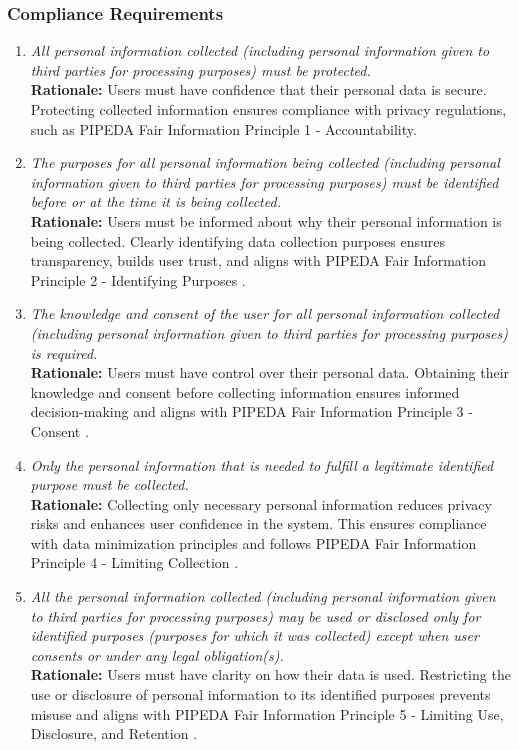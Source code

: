 \documentclass[]{article}
\begin{document}
\subsubsection{Compliance Requirements}
\label{ssub:compliance_requirements}
\begin{enumerate}[{LR-COMP}1. ]
	\item \textit{All personal information collected (including personal information given to third parties for processing purposes) must be protected.}
	\\ \textbf{Rationale:} Users must have confidence that their personal data is secure. Protecting collected information ensures compliance with privacy regulations, such as PIPEDA Fair Information Principle 1 - Accountability\cite{PIPEDA1}.
	\item \textit{The purposes for all personal information being collected (including personal information given to third parties for processing purposes) must be identified before or at the time it is being collected.}
    \\ \textbf{Rationale:} Users must be informed about why their personal information is being collected. Clearly identifying data collection purposes ensures transparency, builds user trust, and aligns with PIPEDA Fair Information Principle 2 - Identifying Purposes \cite{PIPEDA2}.  

    \item \textit{The knowledge and consent of the user for all personal information collected (including personal information given to third parties for processing purposes) is required.}
    \\ \textbf{Rationale:} Users must have control over their personal data. Obtaining their knowledge and consent before collecting information ensures informed decision-making and aligns with PIPEDA Fair Information Principle 3 - Consent \cite{PIPEDA3}.  

    \item \textit{Only the personal information that is needed to fulfill a legitimate identified purpose must be collected.}
    \\ \textbf{Rationale:} Collecting only necessary personal information reduces privacy risks and enhances user confidence in the system. This ensures compliance with data minimization principles and follows PIPEDA Fair Information Principle 4 - Limiting Collection \cite{PIPEDA4}.  

    \item \textit{All the personal information collected (including personal information given to third parties for processing purposes) may be used or disclosed only for identified purposes (purposes for which it was collected) except when user consents or under any legal obligation(s).}
    \\ \textbf{Rationale:} Users must have clarity on how their data is used. Restricting the use or disclosure of personal information to its identified purposes prevents misuse and aligns with PIPEDA Fair Information Principle 5 - Limiting Use, Disclosure, and Retention \cite{PIPEDA5}.  
\end{enumerate}
\end{document}
